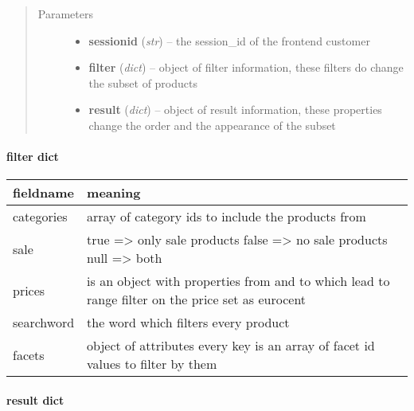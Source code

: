 \documentclass[letterpaper,10pt,english]{sphinxmanual}
\begin{document}
\begin{fulllineitems}
\begin{fulllineitems}
\begin{description}
\begin{enumerate}
\end{enumerate}

\end{description}
\begin{quote}\begin{description}
\item[{Parameters}] \leavevmode\begin{itemize}
\item {} 
\textbf{sessionid} (\emph{str}) -- the session\_id of the frontend customer

\item {} 
\textbf{filter} (\emph{dict}) -- object of filter information, these filters do
change the subset of products

\item {} 
\textbf{result} (\emph{dict}) -- object of result information, these properties
change the order and the appearance of the subset

\end{itemize}

\end{description}\end{quote}
\paragraph{filter dict}

\begin{tabulary}{\linewidth}{|L|L|}
\hline
\textsf{\relax 
fieldname
} & \textsf{\relax 
meaning
}\\
\hline
categories
 & 
array of category ids to include the products from
\\

sale
 & 
true =\textgreater{} only sale products
false =\textgreater{} no sale products
null =\textgreater{} both
\\

prices
 & 
is an object with properties from and to which lead to
range filter on the price set as eurocent
\\

searchword
 & 
the word which filters every product
\\

facets
 & 
object of attributes every key is an array of facet id
values to filter by them
\\
\hline\end{tabulary}

\paragraph{result dict}


\end{fulllineitems}
\end{fulllineitems}
\end{document}
